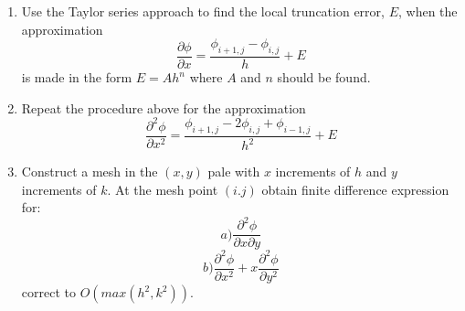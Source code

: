 \begin{enumerate}
\item Use the Taylor series approach to find the local truncation error, $E$, when the approximation\[\frac{\partial \phi}{\partial x}= \frac{\phi_{{i+1},j}-\phi_{i,j}}{h} + E\] is made in the form $E=Ah^n$ where $A$ and $n$ should be found.

\item Repeat the procedure above for the approximation \[\frac{\partial^2 \phi}{\partial x^2}= \frac{\phi_{{i+1},j}-2\phi_{i,j} +\phi_{{i-1},j} }{h^2} + E\]

\item Construct a mesh in the $(x,y )$ pale with $x$ increments of $h$ and $y$ increments of $k$. At the mesh point $(i.j)$ obtain finite difference expression for:
\[a) \frac{\partial^2 \phi}{\partial x \partial y} \] 
\[b) \frac{\partial^2 \phi}{\partial x^2 } + x \frac{\partial^2 \phi}{\partial y^2 }  \] correct to $O(max(h^2,k^2))$.

\end{enumerate}
